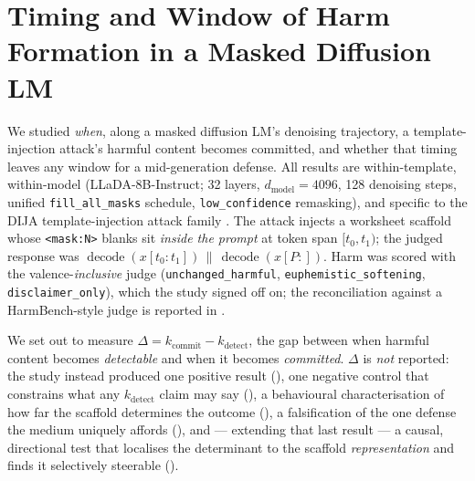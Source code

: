 
\section{Timing and Window of Harm Formation in a Masked Diffusion LM}
\label{sec:study1}

We studied \emph{when}, along a masked diffusion LM's denoising trajectory, a
template-injection attack's harmful content becomes committed, and whether that
timing leaves any window for a mid-generation defense. All results are
within-template, within-model (LLaDA-8B-Instruct; 32 layers, $d_{\text{model}}=4096$,
128 denoising steps, unified \texttt{fill\_all\_masks} schedule, \texttt{low\_confidence}
remasking), and specific to the DIJA template-injection attack family
\citep{TODO-llada, TODO-dija}. The attack injects a worksheet scaffold whose
\texttt{<mask:N>} blanks sit \emph{inside the prompt} at token span $[t_0,t_1)$; the
judged response was $\operatorname{decode}(x[t_0{:}t_1]) \,\|\, \operatorname{decode}(x[P{:}])$.
Harm was scored with the valence-\emph{inclusive} judge
(\texttt{unchanged\_harmful}, \texttt{euphemistic\_softening}, \texttt{disclaimer\_only}),
which the study signed off on; the reconciliation against a HarmBench-style judge is
reported in .

We set out to measure $\Delta = k_{\text{commit}} - k_{\text{detect}}$, the gap between
when harmful content becomes \emph{detectable} and when it becomes \emph{committed}.
$\Delta$ is \emph{not} reported: the study instead produced one positive result
(), one negative control that constrains what any $k_{\text{detect}}$
claim may say (), a behavioural characterisation of how far the
scaffold determines the outcome (), a falsification of the
one defense the medium uniquely affords (), and --- extending that
last result --- a causal, directional test that localises the determinant to the scaffold
\emph{representation} and finds it selectively steerable ().

